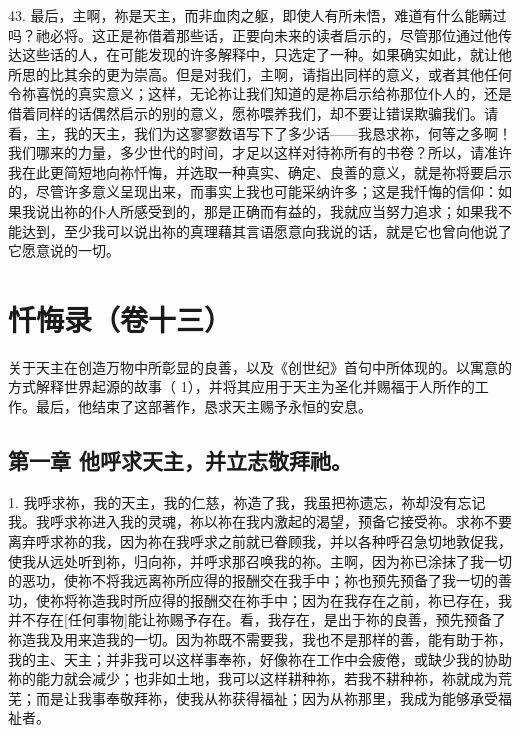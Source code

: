 43. 最后，主啊，祢是天主，而非血肉之躯，即使人有所未悟，难道有什么能瞒过吗？祂必将。这正是祢借着那些话，正要向未来的读者启示的，尽管那位通过他传达这些话的人，在可能发现的许多解释中，只选定了一种。如果确实如此，就让他所思的比其余的更为崇高。但是对我们，主啊，请指出同样的意义，或者其他任何令祢喜悦的真实意义；这样，无论祢让我们知道的是祢启示给祢那位仆人的，还是借着同样的话偶然启示的别的意义，愿祢喂养我们，却不要让错误欺骗我们。请看，主，我的天主，我们为这寥寥数语写下了多少话——我恳求祢，何等之多啊！我们哪来的力量，多少世代的时间，才足以这样对待祢所有的书卷？所以，请准许我在此更简短地向祢忏悔，并选取一种真实、确定、良善的意义，就是祢将要启示的，尽管许多意义呈现出来，而事实上我也可能采纳许多；这是我忏悔的信仰：如果我说出祢的仆人所感受到的，那是正确而有益的，我就应当努力追求；如果我不能达到，至少我可以说出祢的真理藉其言语愿意向我说的话，就是它也曾向他说了它愿意说的一切。\par



\section{忏悔录（卷十三）}

关于天主在创造万物中所彰显的良善，以及《创世纪》首句中所体现的。以寓意的方式解释世界起源的故事（ 1），并将其应用于天主为圣化并赐福于人所作的工作。最后，他结束了这部著作，恳求天主赐予永恒的安息。\par


\subsection{第一章 他呼求天主，并立志敬拜祂。}

1. 我呼求祢，我的天主，我的仁慈，祢造了我，我虽把祢遗忘，祢却没有忘记我。我呼求祢进入我的灵魂，祢以祢在我内激起的渴望，预备它接受祢。求祢不要离弃呼求祢的我，因为祢在我呼求之前就已眷顾我，并以各种呼召急切地敦促我，使我从远处听到祢，归向祢，并呼求那召唤我的祢。主啊，因为祢已涂抹了我一切的恶功，使祢不将我远离祢所应得的报酬交在我手中；祢也预先预备了我一切的善功，使祢将祢造我时所应得的报酬交在祢手中；因为在我存在之前，祢已存在，我并不存在[任何事物]能让祢赐予存在。看，我存在，是出于祢的良善，预先预备了祢造我及用来造我的一切。因为祢既不需要我，我也不是那样的善，能有助于祢，我的主、天主；并非我可以这样事奉祢，好像祢在工作中会疲倦，或缺少我的协助祢的能力就会减少；也非如土地，我可以这样耕种祢，若我不耕种祢，祢就成为荒芜；而是让我事奉敬拜祢，使我从祢获得福祉；因为从祢那里，我成为能够承受福祉者。\par

